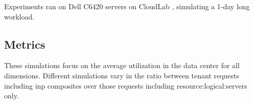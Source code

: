 Experiments ran on Dell C6420 servers on CloudLab \cite{cloudlab}, simulating a 1-day long workload. %

\subsection{Metrics}
These simulations focus on the average  utilization in the data center for all dimensions.
Different simulations vary in the ratio between tenant requests including \gls{inp} composites over those requests including \glspl{resource:logical:server} only.